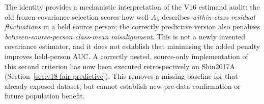 The identity provides a mechanistic interpretation
of the V16 estimand audit: the old frozen covariance
selection scores how well $A_\lambda$ describes
\emph{within-class residual fluctuations} in a
held source person; the correctly predictive version
also penalises \emph{between-source-person class-mean
misalignment}. This is not a newly invented
covariance estimator, and it does not establish that
minimising the added penalty improves held-person AUC.
A correctly nested, source-only implementation of this second
criterion has now been executed retrospectively on Shin2017A
(Section~\ref{sec:v18-fair-predictive}). This removes a missing
baseline for that already exposed dataset, but cannot establish
new pre-data confirmation or future population benefit.
